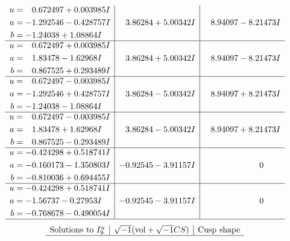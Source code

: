 \documentclass[1p]{elsarticle_modified}
\theoremstyle{definition}
\newcommand{\I}{\sqrt{-1}}
\begin{document}
$$\begin{array}{c|c|c}
\begin{aligned}
u &= \phantom{-}0.672497 + 0.003985 I \\
a &= -1.292546 - 0.428757 I \\
b &= -1.24038 + 1.08864 I\end{aligned}
 & \phantom{-}3.86284 + 5.00342 I & \phantom{-}8.94097 - 8.21473 I \\ \hline\begin{aligned}
u &= \phantom{-}0.672497 + 0.003985 I \\
a &= \phantom{-}1.83478 - 1.62968 I \\
b &= \phantom{-}0.867525 + 0.293489 I\end{aligned}
 & \phantom{-}3.86284 + 5.00342 I & \phantom{-}8.94097 - 8.21473 I \\ \hline\begin{aligned}
u &= \phantom{-}0.672497 - 0.003985 I \\
a &= -1.292546 + 0.428757 I \\
b &= -1.24038 - 1.08864 I\end{aligned}
 & \phantom{-}3.86284 - 5.00342 I & \phantom{-}8.94097 + 8.21473 I \\ \hline\begin{aligned}
u &= \phantom{-}0.672497 - 0.003985 I \\
a &= \phantom{-}1.83478 + 1.62968 I \\
b &= \phantom{-}0.867525 - 0.293489 I\end{aligned}
 & \phantom{-}3.86284 - 5.00342 I & \phantom{-}8.94097 + 8.21473 I \\ \hline\begin{aligned}
u &= -0.424298 + 0.518741 I \\
a &= -0.160173 - 1.350803 I \\
b &= -0.810036 + 0.694455 I\end{aligned}
 & -0.92545 - 3.91157 I & \phantom{-0.000000 } 0 \\ \hline\begin{aligned}
u &= -0.424298 + 0.518741 I \\
a &= -1.56737 - 0.27953 I \\
b &= -0.768678 - 0.490054 I\end{aligned}
 & -0.92545 - 3.91157 I & \phantom{-0.000000 } 0\\
 \hline 
 \end{array}$$\newpage$$\begin{array}{c|c|c}  
\text{Solutions to }I^u_{9}& \I (\text{vol} + \sqrt{-1}CS) & \text{Cusp shape}\\
 \hline 

\end{array}$$
\end{document}
